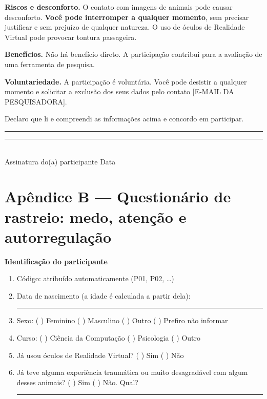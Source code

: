\vspace{0.3cm}
\noindent\textbf{Riscos e desconforto.} O contato com imagens de animais pode
causar desconforto. \textbf{Você pode interromper a qualquer momento}, sem
precisar justificar e sem prejuízo de qualquer natureza. O uso de óculos de
Realidade Virtual pode provocar tontura passageira.

\vspace{0.3cm}
\noindent\textbf{Benefícios.} Não há benefício direto. A participação contribui
para a avaliação de uma ferramenta de pesquisa.

\vspace{0.3cm}
\noindent\textbf{Voluntariedade.} A participação é voluntária. Você pode
desistir a qualquer momento e solicitar a exclusão dos seus dados pelo contato
[E-MAIL DA PESQUISADORA].

\vspace{0.6cm}
\noindent Declaro que li e compreendi as informações acima e concordo em
participar.

\vspace{0.8cm}
\noindent\rule{8cm}{0.4pt}\hfill\rule{4cm}{0.4pt}\\
Assinatura do(a) participante \hfill Data

\endgroup

\newpage
\section*{Apêndice B --- Questionário de rastreio: medo, atenção e autorregulação}


\begingroup\singlespacing

\noindent\textbf{Identificação do participante}

\begin{enumerate}
  \item Código: atribuído automaticamente (P01, P02, \ldots)
  \item Data de nascimento (a idade é calculada a partir dela): \rule{3cm}{0.4pt}
  \item Sexo: ( ) Feminino \quad ( ) Masculino \quad ( ) Outro \quad ( ) Prefiro não informar
  \item Curso: ( ) Ciência da Computação \quad ( ) Psicologia \quad ( ) Outro
  \item Já usou óculos de Realidade Virtual? ( ) Sim \quad ( ) Não
  \item Já teve alguma experiência traumática ou muito desagradável com algum
  desses animais? ( ) Sim \quad ( ) Não. Qual? \rule{5cm}{0.4pt}
\end{enumerate}

